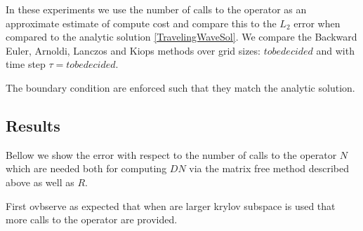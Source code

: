 In these experiments we use the number of calls to the operator as an approximate estimate of compute cost and compare this to the $L_2$ error when compared to the analytic solution \eqref{TravelingWaveSol}.
We compare the Backward Euler, Arnoldi, Lanczos and Kiops methods over grid sizes: $to be decided$ and with time step $\tau=tobedecided$.

The boundary condition are enforced such that they match the analytic solution.

\subsection{Results}

Bellow we show the error with respect to the number of calls to the operator $N$ which are needed both for computing $DN$ via the matrix free method described above as well as $R$.


First ovbserve as expected that when are larger krylov subspace is used that more calls to the operator are provided.


